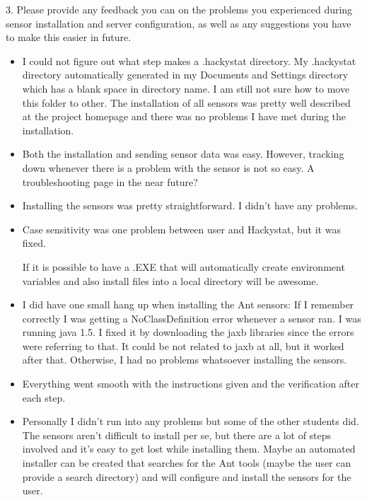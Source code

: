 3. Please provide any feedback you can on the problems you 
experienced during sensor installation and server conﬁguration, as well as any suggestions you have to make this easier 
in future.
\begin{itemize}
\item I could not figure out what step makes a .hackystat directory. My .hackystat directory automatically generated in my Documents and Settings directory which has a blank space in directory name. I am still not sure how to move this folder to other. The installation of all sensors was pretty well described at the project homepage and there was no problems I have met during the installation. 

\item Both the installation and sending sensor data was easy.  However, tracking down whenever there is a problem with the sensor is not so easy.  A troubleshooting page in the near future?

\item Installing the sensors was pretty straightforward.  I didn't have any problems.

\item Case sensitivity was one problem between user and Hackystat, but it was fixed.  

If it is possible to have a .EXE that will automatically create environment variables and also install files into a local directory will be awesome.

\item I did have one small hang up when installing the Ant sensors: If I remember correctly I was getting a NoClassDefinition error whenever a sensor ran. I was running java 1.5. I fixed it by downloading the jaxb libraries since the errors were referring to that. It could be not related to jaxb at all, but it worked after that. Otherwise, I had no problems whatsoever installing the sensors.

\item Everything went smooth with the instructions given and the verification after each step.

\item Personally I didn't run into any problems but some of the other students did. The sensors aren't difficult to install per se, but there are a lot of steps involved and it's easy to get lost while installing them. Maybe an automated installer can be created that searches for the Ant tools (maybe the user can provide a search directory) and will configure and install the sensors for the user.


\end{itemize}
